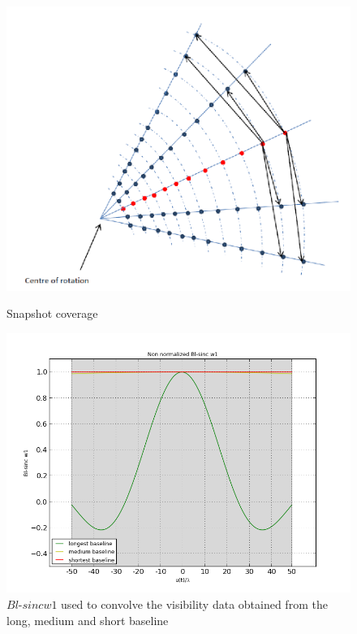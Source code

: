 \documentclass[useAMS,usenatbib]{mn2e}
\begin{document}
\begin{figure}
 \centering
\begin{minipage}{0.38\linewidth}\includegraphics[width=1\textwidth]{./Figures/uvcov.png}\caption{Snapshot coverage}\label{fig:uvcov} 
\end{minipage}
\begin{minipage}{0.38\linewidth}\includegraphics[width=1\textwidth]{./Figures/longshortmid.png}\caption{$Bl$-$sinc w1$ used to convolve the 
visibility data obtained from the long, medium and short baseline}\label{fig:fig_2b}
\end{minipage}
\end{figure}
\end{document}
